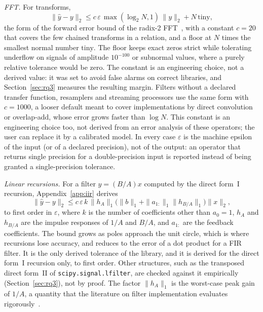 \documentclass[10pt,conference]{IEEEtran}
\newcommand{\eps}{\varepsilon}
\newcommand{\code}[1]{\texttt{#1}}
\begin{document}
\emph{FFT.} For transforms,
\begin{equation}
\|\hat y-y\|_2 \le c\,\eps\,\max(\log_2N,1)\,\|y\|_2 + N\,\mathrm{tiny},
\label{eq:fft}
\end{equation}
the form of the forward error bound of the radix-2
FFT~\cite[Thm.~24.2]{higham2002accuracy}, with a constant $c=20$ that covers
the few chained transforms in a relation, and a floor at $N$ times the smallest
normal number $\mathrm{tiny}$. The floor keeps exact zeros strict while
tolerating underflow on signals of amplitude $10^{-100}$ or subnormal values,
where a purely relative tolerance would be zero. The constant is an
engineering choice, not a derived value: it was set to avoid false alarms on
correct libraries, and Section~\ref{sec:rq3} measures the resulting margin.
Filters without a declared transfer function, resamplers and streaming
processors use the same form with $c=1000$, a looser default meant to cover
implementations by direct convolution or overlap-add, whose error grows faster
than $\log N$. This constant is an engineering choice too, not derived from an
error analysis of these operators; the user can replace it by a calibrated
model. In every case
$\eps$ is the machine epsilon of the input (or of a declared precision), not of
the output: an operator that returns single precision for a double-precision
input is reported instead of being granted a single-precision tolerance.

\emph{Linear recursions.} For a filter $y=(B/A)x$ computed by the direct form~I
recursion, Appendix~\ref{app:iir} derives
\begin{equation}
\|\hat y-y\|_2 \le c\,\eps\,k\,\|h_A\|_1\bigl(\|b\|_1+\|a_{1:}\|_1\|h_{B/A}\|_1\bigr)\|x\|_2,
\label{eq:iir}
\end{equation}
to first order in $\eps$, where $k$ is the number of coefficients other than $a_0=1$, $h_A$ and
$h_{B/A}$ are the impulse responses of $1/A$ and $B/A$, and $a_{1:}$ are the
feedback coefficients. The bound grows as poles approach the unit circle, which
is where recursions lose accuracy, and reduces to the error of a dot product for
a FIR filter. It is the only derived tolerance of the library, and it is
derived for the direct form~I recursion only, to first order. Other
structures, such as the transposed direct form~II of \code{scipy.signal.lfilter},
are checked against it empirically (Section~\ref{sec:rq3}), not by proof. The
factor $\|h_A\|_1$ is the worst-case peak gain of $1/A$, a quantity that the
literature on filter implementation evaluates
rigorously~\cite{volkova2015wcpg}.
\end{document}
